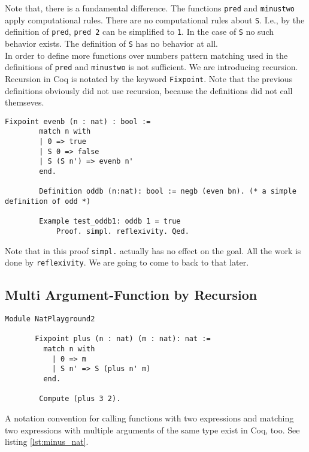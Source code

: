 	     
	  Note that, there is a fundamental difference.
	  The functions \lstinline!pred! and \lstinline!minustwo! apply computational rules. 
	  There are no computational rules about \lstinline!S!.
	  I.e., by the definition of \lstinline!pred!, \lstinline!pred 2! can be simplified to \lstinline!1!. 
	  In the case of \lstinline!S! no such behavior exists.
	  The definition of \lstinline!S! has no behavior at all.\\     
	  
	  In order to define more functions over numbers pattern matching used in the definitions of \lstinline!pred! and \lstinline!minustwo! is not sufficient. We are introducing recursion.
	  Recursion in Coq is notated by the keyword \lstinline!Fixpoint!. Note that the previous definitions obviously did not use recursion, because the definitions did not call themseves.
	  
	  \begin{lstlisting}[caption = \lstinline!evenb! and \lstinline!oddb!]
	  Fixpoint evenb (n : nat) : bool :=
	  	match n with
	  	| 0 => true
	  	| S 0 => false
	  	| S (S n') => evenb n'
	  	end.
	  	
	  	Definition oddb (n:nat): bool := negb (even bn). (* a simple definition of odd *)
	  	
	  	Example test_oddb1: oddb 1 = true
	    	Proof. simpl. reflexivity. Qed.
	  \end{lstlisting}
	   Note that in this proof \lstinline!simpl.! actually has no effect on the goal. 
	   All the work is done by \lstinline!reflexivity!. 
	   We are going to come to back to that later.

	   
   \subsection{Multi Argument-Function by Recursion}
	   
	   \begin{lstlisting}[caption = \lstinline!plus!]
	   Module NatPlayground2
	   
	   Fixpoint plus (n : nat) (m : nat): nat :=
	     match n with
	       | 0 => m
	       | S n' => S (plus n' m)
	     end.
	     
	    Compute (plus 3 2). 
	   \end{lstlisting}   
	    A notation convention for calling functions with two expressions and matching two expressions with multiple arguments of the same type exist in Coq, too. 
	    See listing \ref{lst:minus_nat}.
	    
